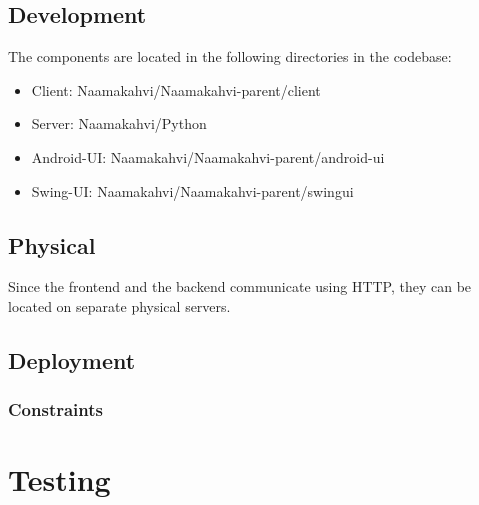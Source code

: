 \documentclass[11pt]{article}
\begin{document}
\subsection{Development}

The components are located in the following directories in the codebase:
\begin{itemize}
\item Client: Naamakahvi/Naamakahvi-parent/client

\item Server: Naamakahvi/Python

\item Android-UI: Naamakahvi/Naamakahvi-parent/android-ui

\item Swing-UI: Naamakahvi/Naamakahvi-parent/swingui
\end{itemize}


\subsection{Physical}

Since the frontend and the backend communicate using HTTP, they can be
located on separate physical servers. %

\subsection{Deployment}

\subsubsection{Constraints}



\section{Testing}
\end{document}
